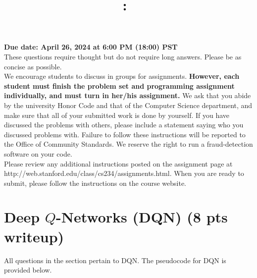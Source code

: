 \documentclass{article}
\title{
\vspace{-1in}
\textmd{\textbf{\hmwkClass:\ \hmwkTitle}}}
\author{}
\date{} %
\begin{document}
\maketitle
\vspace{-.5in}
\begin{framed}
{\bf Due date: April 26, 2024 at 6:00 PM (18:00) PST}
\\[1em]
These questions require thought but do not require long answers. Please be as concise as possible.
\\[1em]
We encourage students to discuss in groups for assignments. \textbf{However, each student must finish the
problem set and programming assignment individually, and must turn in her/his assignment.} We ask
that you abide by the university Honor Code and that of the Computer Science department, and make
sure that all of your submitted work is done by yourself. If you have discussed the problems with others,
please include a statement saying who you discussed problems with. Failure to follow these instructions
will be reported to the Office of Community Standards. We reserve the right to run a fraud-detection software on your code.
\\[1em]
Please review any additional instructions posted on the assignment page at
http://web.stanford.edu/class/cs234/assignments.html. When you are ready to submit, please
follow the instructions on the course website.
\\[1em]
\end{framed}

\section{Deep $Q$-Networks (DQN) (8 pts writeup)}

All questions in the section pertain to DQN. The pseudocode for DQN is provided below.
\end{document}
